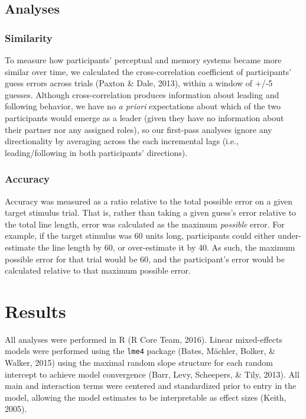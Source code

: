 \documentclass[10pt, letterpaper]{article}
\begin{document}
\subsection{Analyses}\label{analyses}

\subsubsection{Similarity}\label{similarity}

To measure how participants' perceptual and memory systems became more
similar over time, we calculated the cross-correlation coefficient of
participants' guess errors across trials (Paxton \& Dale, 2013), within
a window of +/-5 guesses. Although cross-correlation produces
information about leading and following behavior, we have no \emph{a
priori} expectations about which of the two participants would emerge as
a leader (given they have no information about their partner nor any
assigned roles), so our first-pass analyses ignore any directionality by
averaging across the each incremental lags (i.e., leading/following in
both participants' directions).

\subsubsection{Accuracy}\label{accuracy}

Accuracy was measured as a ratio relative to the total possible error on
a given target stimulus trial. That is, rather than taking a given
guess's error relative to the total line length, error was calculated as
the maximum \emph{possible} error. For example, if the target stimulus
was 60 units long, participants could either under-estimate the line
length by 60, or over-estimate it by 40. As such, the maximum possible
error for that trial would be 60, and the participant's error would be
calculated relative to that maximum possible error.

\section{Results}\label{results}

All analyses were performed in R (R Core Team, 2016). Linear
mixed-effects models were performed using the \texttt{lme4} package
(Bates, Mächler, Bolker, \& Walker, 2015) using the maximal random slope
structure for each random intercept to achieve model convergence (Barr,
Levy, Scheepers, \& Tily, 2013). All main and interaction terms were
centered and standardized prior to entry in the model, allowing the
model estimates to be interpretable as effect sizes (Keith, 2005).
\end{document}
